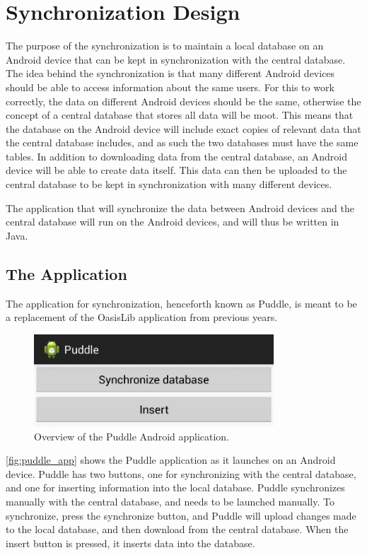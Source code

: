 \section{Synchronization Design}
The purpose of the synchronization is to maintain a local database on an Android device that can be kept in synchronization with the central database. The idea behind the synchronization is that many different Android devices should be able to access information about the same users. For this to work correctly, the data on different Android devices should be the same, otherwise the concept of a central database that stores all data will be moot. This means that the database on the Android device will include exact copies of relevant data that the central database includes, and as such the two databases must have the same tables. In addition to downloading data from the central database, an Android device will be able to create data itself. This data can then be uploaded to the central database to be kept in synchronization with many different devices.

The application that will synchronize the data between Android devices and the central database will run on the Android devices, and will thus be written in Java.

\subsection{The Application}
The application for synchronization, henceforth known as Puddle, is meant to be a replacement of the OasisLib application from previous years.

\begin{figure}[hptb]
    \begin{center}
    \includegraphics[width=0.8\textwidth]{img/puddle-app.png}
    \caption{Overview of the Puddle Android application.}
    \label{fig:puddle_app}
    \end{center}
\end{figure}

\autoref{fig:puddle_app} shows the Puddle application as it launches on an Android device. Puddle has two buttons, one for synchronizing with the central database, and one for inserting information into the local database. Puddle synchronizes manually with the central database, and needs to be launched manually. To synchronize, press the synchronize button, and Puddle will upload changes made to the local database, and then download from the central database. When the insert button is pressed, it inserts data into the database.

